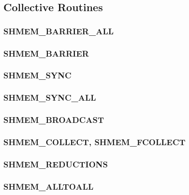 \documentclass[10pt]{book}
\begin{document}
\subsection{Collective Routines}\label{subsec:coll}


\subsubsection{\textbf{SHMEM\_BARRIER\_ALL}}\label{subsec:shmem_barrier_all}


\subsubsection{\textbf{SHMEM\_BARRIER}}\label{subsec:shmem_barrier}


\subsubsection{\textbf{SHMEM\_SYNC}}\label{subsec:shmem_sync}


\subsubsection{\textbf{SHMEM\_SYNC\_ALL}}\label{subsec:shmem_sync_all}


\subsubsection{\textbf{SHMEM\_BROADCAST}}\label{subsec:shmem_broadcast}


\subsubsection{\textbf{SHMEM\_COLLECT, SHMEM\_FCOLLECT}}\label{subsec:shmem_collect}


\subsubsection{\textbf{SHMEM\_REDUCTIONS}}\label{subsec:shmem_reductions}


\subsubsection{\textbf{SHMEM\_ALLTOALL}}\label{subsec:shmem_alltoall}

\end{document}
